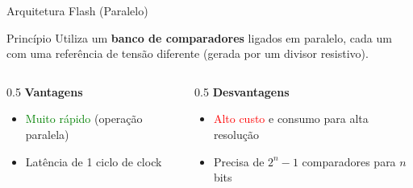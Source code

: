 \documentclass{beamer}
\begin{document}
\begin{frame}{Arquitetura Flash (Paralelo)}
    \begin{block}{Princípio}
        Utiliza um \textbf{banco de comparadores} ligados em paralelo, cada um com uma referência de tensão diferente (gerada por um divisor resistivo).
    \end{block}
    \begin{figure}
        \centering
    \end{figure}
    \begin{columns}[t]
        \begin{column}{0.5\textwidth}
            \textbf{Vantagens}
            \begin{itemize}
                \item \textcolor{green}{Muito rápido} (operação paralela)
                \item Latência de 1 ciclo de clock
            \end{itemize}
        \end{column}
        \begin{column}{0.5\textwidth}
            \textbf{Desvantagens}
            \begin{itemize}
                \item \textcolor{red}{Alto custo} e consumo para alta resolução
                \item Precisa de $2^n - 1$ comparadores para $n$ bits
            \end{itemize}
        \end{column}
    \end{columns}
\end{frame}
\end{document}
